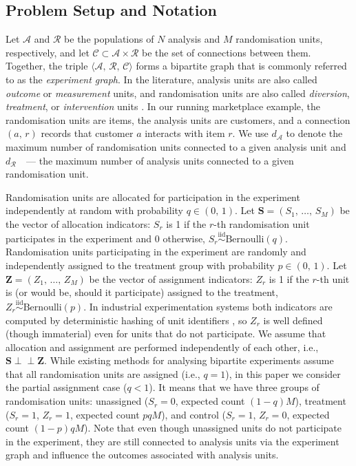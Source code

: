 \documentclass[sigconf,anonymous,review]{acmart}
\newcommand{\iidsiminline}{{\scriptstyle\stackrel{\mathrm{iid}}{\sim}}}
\newcommand{\ind}{\perp\!\!\!\perp}
\begin{document}
\subsection{Problem Setup and Notation}\label{subsec:notation}

Let $\mathcal A$ and $\mathcal R$ be the populations of $N$ analysis and $M$ randomisation units, respectively, and let $\mathcal C\subset \mathcal A \times \mathcal R$ be the set of connections between them. Together, the triple $\langle \mathcal A,\,\mathcal R,\,\mathcal C\rangle$ forms a bipartite graph that is commonly referred to as the \emph{experiment graph}. In the literature, analysis units are also called \emph{outcome} or \emph{measurement} units, and randomisation units are also called \emph{diversion}, \emph{treatment}, or \emph{intervention} units \cite{zigler2021bipartite,harshaw2023erl,doudchenko2020causal,tan2025estimating}. In our running marketplace example, the randomisation units are items, the analysis units are customers, and a connection $(a,\,r)$ records that customer $a$ interacts with item $r$. We use $d_\mathcal{A}$ to denote the maximum number of randomisation units connected to a given analysis unit and $d_\mathcal{R}$~~---  the maximum number of analysis units connected to a given randomisation unit.

Randomisation units are allocated for participation in the experiment independently at random with probability $q\in(0,\,1)$. Let $\mathbf{S} =(S_1,\,\ldots,\,S_M)$ be the vector of allocation indicators: $S_r$ is 1 if the $r$-th randomisation unit participates in the experiment and $0$ otherwise, $S_r\iidsiminline \mathrm{Bernoulli}(q)$. Randomisation units participating in the experiment are randomly and independently assigned to the treatment group with probability $p\in(0,\,1)$. Let $\mathbf Z=(Z_1,\,\ldots,\,Z_M)$ be the vector of assignment indicators: $Z_r$ is 1 if the $r$-th unit is (or would be, should it participate) assigned to the treatment, $Z_r\iidsiminline \mathrm{Bernoulli}(p)$. In industrial experimentation systems both indicators are computed by deterministic hashing of unit identifiers \cite{tang2010overlapping,kohavi2020trustworthy}, so $Z_r$ is well defined (though immaterial) even for units that do not participate. We assume that allocation and assignment are performed independently of each other, i.e., $\mathbf S \ind \mathbf{Z}$. While existing methods for analysing bipartite experiments assume that all randomisation units are assigned (i.e., $q=1$), in this paper we consider the partial assignment case ($q < 1$). It means that we have three groups of randomisation units: unassigned ($S_r = 0$, expected count $(1-q)M$), treatment ($S_r=1$, $Z_r=1$, expected count $pqM$), and control ($S_r=1$, $Z_r=0$, expected count $(1-p)qM$).
Note that even though unassigned units do not participate in the experiment, they are still connected to analysis units via the experiment graph and influence the outcomes associated with analysis units.
\end{document}
